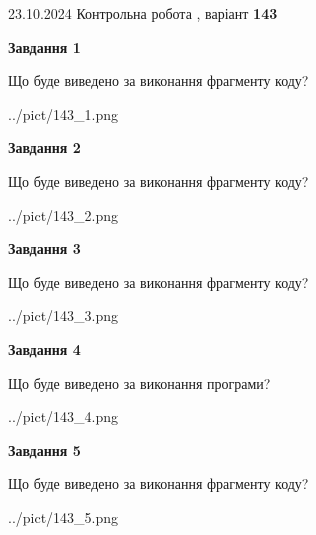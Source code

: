 \documentclass[12pt, ukrainian]{article}
\begin{document}
{\Large{23.10.2024 Контрольна робота , варіант  \No \textbf { 143 }\par}}
{
\begin {large}
{\begin {center}\textbf{Завдання 1}\end {center}}

Що буде виведено за виконання фрагменту коду?\par
\begin{center}
	{../pict/143_1.png}
\end{center}
\newpage

{\begin {center}\textbf{Завдання 2}\end {center}}

Що буде виведено за виконання фрагменту коду?\par
\begin{center}
	{../pict/143_2.png}
\end{center}
\newpage

{\begin {center}\textbf{Завдання 3}\end {center}}

Що буде виведено за виконання фрагменту коду?\par
\begin{center}
	{../pict/143_3.png}
\end{center}
\newpage

{\begin {center}\textbf{Завдання 4}\end {center}}

Що буде виведено за виконання програми?\par
\begin{center}
	{../pict/143_4.png}
\end{center}
\newpage

{\begin {center}\textbf{Завдання 5}\end {center}}

Що буде виведено за виконання фрагменту коду?\par
\begin{center}
	{../pict/143_5.png}
\end{center}
\newpage


\end{large}}
\end{document}
